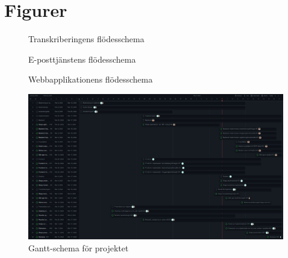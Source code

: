 \chapter{Figurer}

\begin{figure}[h]
  \centering
  
  \caption{Transkriberingens flödesschema}
  \label{fig:transcription-flowchart}
\end{figure}

\begin{figure}[h]
  \centering
  
  \caption{E-posttjänstens flödesschema}
  \label{fig:email-flowchart}
\end{figure}

\begin{figure}[h]
  \centering
  
  \caption{Webbapplikationens flödesschema}
  \label{fig:system-flowchart}
\end{figure}

\begin{figure}[h]
  \centering
  \includegraphics[width=1\textwidth]{images/gantt}
  \caption{Gantt-schema för projektet}
  \label{fig:gantt}
\end{figure}
